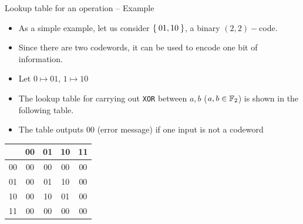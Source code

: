 \begin{frame}{Lookup table for an operation -- Example}
    \begin{example}
    \begin{itemize}
        \item As a simple example, let us consider $\Set{01,10}$, a binary $(2,2)-$code.
        \item Since there are two codewords, it can be used to encode one bit of information.
        \item Let $0\mapsto 01$, $1\mapsto 10$
        \item The lookup table for carrying out \texttt{XOR} between $a,b$ ($a,b\in{\mathbb F}_2$) is shown in the following table.
        \item The table outputs $00$ (error message) if one input is not a codeword
    \end{itemize}
\begin{table}[htb]
    \centering
    \begin{tabular}{c|c|c|c|c}
          &  00  &  01  & 10  & 11\\\hline
      00  &  00  &  00  & 00  & 00\\
      01  &  00  &  01  & 10   & 00 \\
      10  &  00  &  10  & 01  & 00 \\
      11  &  00  &  00  & 00  & 00 
    \end{tabular}
\end{table}
\end{example}
\end{frame}

